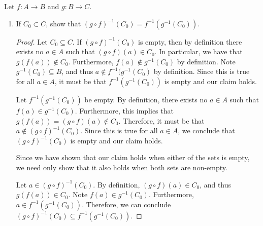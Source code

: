 \documentclass[12pt]{article}
\begin{document}
 Let $f: A \to B$ and $g: B \to C$.
\begin{enumerate}[label=(\alph*)]
	\item If $C_0 \subset C$, show that $(g \circ f)^{-1}(C_0) = f^{-1}(g^{-1}(C_0))$.
	\begin{proof}
		Let $C_0 \subseteq C$. If $(g \circ f)^{-1}(C_0)$ is empty, then by definition
		there exists no $a \in A$ such that $(g \circ f)(a) \in C_0$. In particular,
		we have that $g(f(a)) \notin C_0$. Furthermore, $f(a) \notin g^{-1}(C_0)$ by definition.
		Note $g^{-1}(C_0) \subseteq B$, and thus $a \notin f^{-1}(g^{-1}(C_0)$ by definition.
		Since this is true for all $a \in A$, it must be that $f^{-1}(g^{-1}(C_0))$ is empty
		and our claim holds.
		
		Let $f^{-1}(g^{-1}(C_0))$ be empty.	By definition, there exists no $a \in A$
		such that ${f(a) \in g^{-1}(C_0)}$. Furthermore, this implies that 
		$g(f(a)) = (g \circ f)(a) \notin C_0$. Therefore, it must be that $a \notin (g \circ f)^{-1}(C_0)$.
		Since this is true for all $a \in A$, we conclude that $(g \circ f)^{-1}(C_0)$ is empty
		and our claim holds.
		
		Since we have shown that our claim holds when either of the sets is empty, we need only 
		show that it also holds when both sets are non-empty.
		
		Let $a \in (g \circ f)^{-1}(C_0)$. By definition, $(g \circ f)(a) \in C_0$, and thus
		$g(f(a)) \in C_0$. Note $f(a) \in g^{-1}(C_0)$. Furthermore, $a \in f^{-1}(g^{-1}(C_0))$.
		Therefore, we can conclude ${(g \circ f)^{-1}(C_0) \subseteq f^{-1}(g^{-1}(C_0))}$.
		

\end{proof}
\end{enumerate}
\end{document}
